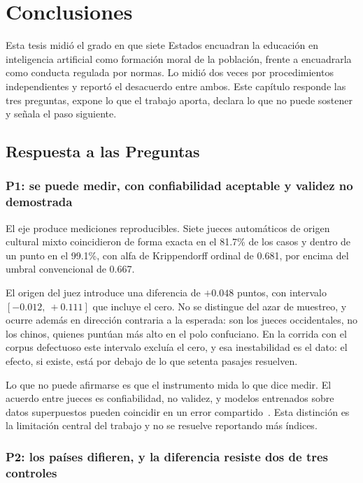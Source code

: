 
\chapter{Conclusiones}
\label{cap:conclusiones}

Esta tesis midió el grado en que siete Estados encuadran la educación en inteligencia artificial como formación moral de la población, frente a encuadrarla como conducta regulada por normas. Lo midió dos veces por procedimientos independientes y reportó el desacuerdo entre ambos. Este capítulo responde las tres preguntas, expone lo que el trabajo aporta, declara lo que no puede sostener y señala el paso siguiente.

\section{Respuesta a las Preguntas}

\subsection{P1: se puede medir, con confiabilidad aceptable y validez no demostrada}

El eje \ejedf produce mediciones reproducibles. Siete jueces automáticos de origen cultural mixto coincidieron de forma exacta en el 81.7\% de los casos y dentro de un punto en el 99.1\%, con alfa de Krippendorff ordinal de 0.681, por encima del umbral convencional de 0.667.

El origen del juez introduce una diferencia de $+0.048$ puntos, con intervalo $[-0.012,\ +0.111]$ que incluye el cero. No se distingue del azar de muestreo, y ocurre además en dirección contraria a la esperada: son los jueces occidentales, no los chinos, quienes puntúan más alto en el polo confuciano. En la corrida con el corpus defectuoso este intervalo excluía el cero, y esa inestabilidad es el dato: el efecto, si existe, está por debajo de lo que setenta pasajes resuelven.

Lo que no puede afirmarse es que el instrumento mida lo que dice medir. El acuerdo entre jueces es confiabilidad, no validez, y modelos entrenados sobre datos superpuestos pueden coincidir en un error compartido~\citep{halterman2025codebook}. Esta distinción es la limitación central del trabajo y no se resuelve reportando más índices.

\subsection{P2: los países difieren, y la diferencia resiste dos de tres controles}

